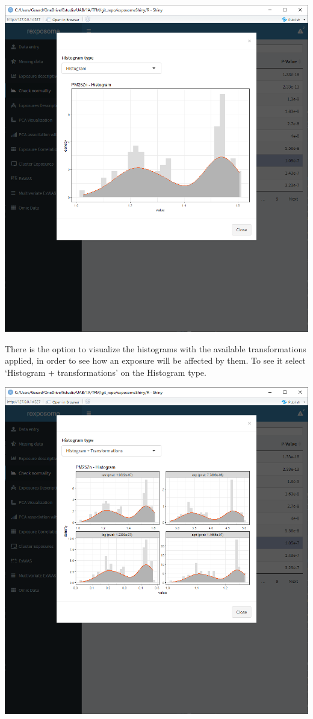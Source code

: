 \documentclass[
]{book}
\begin{document}
\includegraphics{images/analysis3_2_2.png}

There is the option to visualize the histograms with the available transformations applied, in order to see how an exposure will be affected by them. To see it select `Histogram + transformations' on the Histogram type.

\includegraphics{images/analysis3_2_3.png}
\end{document}
